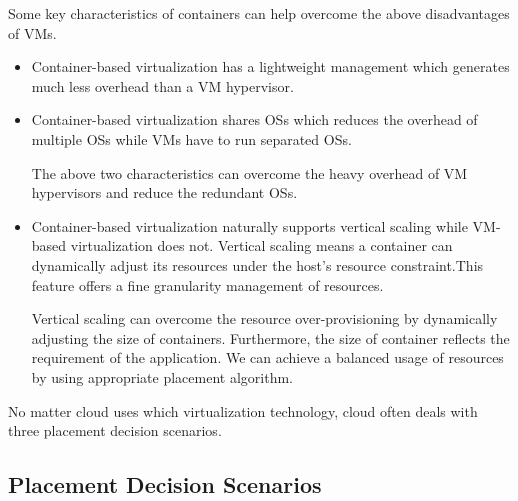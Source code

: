 Some key characteristics of containers can help overcome the above disadvantages of VMs.
\begin{itemize}
	\item Container-based virtualization has a lightweight management which generates much less overhead than a VM hypervisor. 
	\item Container-based virtualization shares OSs which reduces the overhead of multiple OSs while VMs have to run separated OSs.

	The above two characteristics can overcome the heavy overhead of VM hypervisors and reduce the redundant OSs.
	\item Container-based virtualization naturally supports vertical scaling while VM-based virtualization does not. Vertical scaling means a container can dynamically adjust its resources under the host's resource constraint.This feature offers a fine granularity management of resources. 

	Vertical scaling can overcome the resource over-provisioning by dynamically adjusting the size of containers. Furthermore, the size of container reflects the requirement of the application. We can achieve a balanced usage of resources by using appropriate placement algorithm.

\end{itemize}



 No matter cloud uses which virtualization technology, cloud often deals with three placement decision scenarios. 




\subsection{Placement Decision Scenarios}
\label{sec:scenarios}

